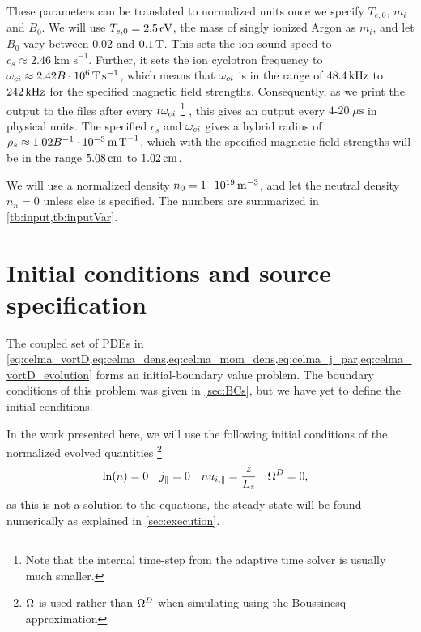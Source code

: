 These parameters can be translated to normalized units once we specify $T_{e,0}$, $m_i$ and $B_0$.
We will use $T_{e,0} = 2.5\, \text{eV}$, the mass of singly ionized Argon as $m_i$, and let $B_0$ vary between $0.02$ and $0.1 \, \text{T}$.
This sets the ion sound speed to $c_s \approx 2.46\; \text{km s}^{-1}$.
Further, it sets the ion cyclotron frequency to $\omega_{ci}\approx 2.42 B \cdot 10^6 \, \text{T}\, \text{s}^{-1}$, which means that $\omega_{ci}$ is in the range of $48.4\, \text{kHz}$ to $242\, \text{kHz}$ for the specified magnetic field strengths.
Consequently, as we print the output to the files after every $t\omega_{ci}$%
\footnote{Note that the internal time-step from the adaptive time solver is usually much smaller.}%
%
, this gives an output every $4$-$20\;\mu\text{s}$ in physical units.
The specified $c_s$ and $\omega_{ci}$ gives a hybrid radius of $\rho_s \approx 1.02B^{-1}\cdot10^{-3}\, \text{m}\, \text{T}^{-1}$, which with the specified magnetic field strengths will be in the range $5.08\, \text{cm}$ to $1.02\, \text{cm}$.

We will use a normalized density $n_0 = 1\cdot 10^{19} \, \text{m}^{-3}$, and let the neutral density $n_n=0$ unless else is specified.
The numbers are summarized in \cref{tb:input,tb:inputVar}.


\section{Initial conditions and source specification}
\label{sec:initRun}
%
The coupled set of PDEs in \cref{eq:celma_vortD,eq:celma_dens,eq:celma_mom_dens,eq:celma_j_par,eq:celma_vortD_evolution} forms an initial-boundary value problem.
The boundary conditions of this problem was given in \cref{sec:BCs}, but we have yet to define the initial conditions.

In the work presented here, we will use the following initial conditions of the normalized evolved quantities%
%
\footnote{$\Omega$ is used rather than $\Omega^D$ when simulating using the Boussinesq approximation}%
%
\begin{align*}
    &\ln(n)    = 0&
    &j_\|      = 0&
    &nu_{i,\|} = \frac{z}{L_z}&
    &\Omega^D     = 0,&
\end{align*}
%
as this is not a solution to the equations, the steady state will be found numerically as explained in \cref{sec:execution}.

